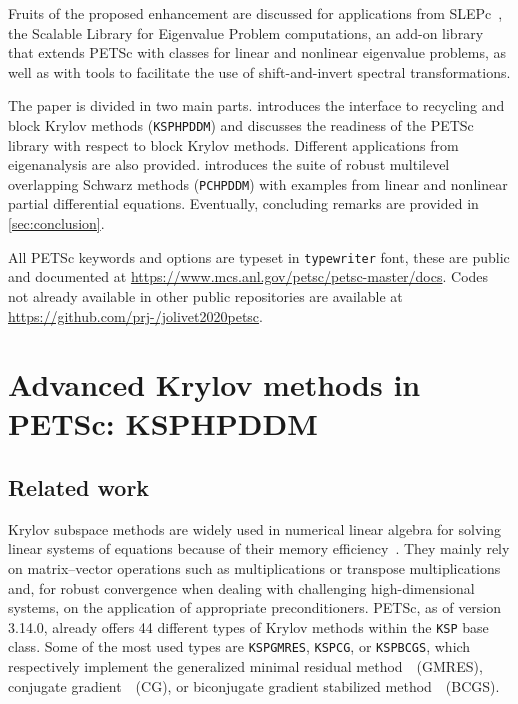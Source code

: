 \documentclass[3p,11pt]{elsarticle}
\newcommand{\pk}[1]{\texttt{#1}}
\begin{document}
Fruits of the proposed enhancement are discussed for applications from
SLEPc~\cite{hernandez2005ssf}, the Scalable Library for Eigenvalue Problem
computations, an add-on library that extends PETSc with classes for
linear and nonlinear eigenvalue problems, as well as with tools to facilitate
the use of shift-and-invert spectral transformations.

The paper is divided in two main parts.  introduces
the interface to recycling and block Krylov methods
(\pk{KSPHPDDM}) and discusses the readiness of the PETSc library with respect to block Krylov methods.
Different applications from eigenanalysis are also provided.
 introduces the suite of robust multilevel overlapping Schwarz methods (\pk{PCHPDDM})
with examples from linear and nonlinear partial differential equations.
Eventually, concluding remarks are provided in \cref{sec:conclusion}.

All PETSc
keywords and options are typeset in \texttt{typewriter} font, these are
public and documented at \url{https://www.mcs.anl.gov/petsc/petsc-master/docs}.
Codes not already available in other public repositories are available at 
\url{https://github.com/prj-/jolivet2020petsc}.

\section{Advanced Krylov methods in PETSc: KSPHPDDM}\label{sec:KSPHPDDM}
  \subsection{Related work}
Krylov subspace methods are widely used in numerical linear algebra for solving
linear systems of equations because of their memory efficiency~\cite{barrett1994templates,saad2003iterative}.
They mainly rely on matrix--vector
operations such as multiplications or transpose multiplications and,
for robust convergence when dealing with challenging high-dimensional systems,
on the application of appropriate preconditioners.
PETSc, as of version 3.14.0, already offers 44 different types of
Krylov methods within the \pk{KSP} base class. Some of the
most used types are \pk{KSPGMRES}, \pk{KSPCG}, or \pk{KSPBCGS}, which respectively implement
the generalized minimal residual method~\cite{saad1986gmres}~(GMRES), conjugate
gradient~\cite{hestenes1952methods}~(CG), or biconjugate gradient stabilized method~\cite{van1992bi}~(BCGS). %
\end{document}
